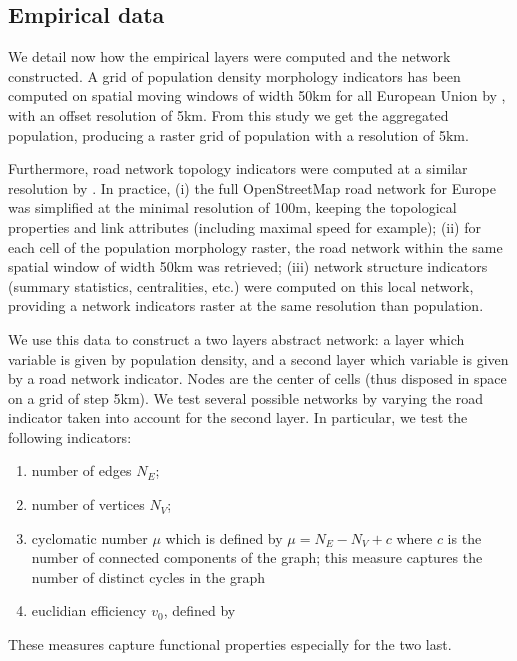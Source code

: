 \documentclass{jimis-en}
\begin{document}
\subsection{Empirical data}


We detail now how the empirical layers were computed and the network constructed. A grid of population density morphology indicators has been computed on spatial moving windows of width 50km for all European Union by \cite{raimbault2018calibration}, with an offset resolution of 5km. From this study we get the aggregated population, producing a raster grid of population with a resolution of 5km.

Furthermore, road network topology indicators were computed at a similar resolution by \cite{raimbault2018urban}. In practice, (i) the full OpenStreetMap road network for Europe was simplified at the minimal resolution of 100m, keeping the topological properties and link attributes (including maximal speed for example); (ii) for each cell of the population morphology raster, the road network within the same spatial window of width 50km was retrieved; (iii) network structure indicators (summary statistics, centralities, etc.) were computed on this local network, providing a network indicators raster at the same resolution than population.

We use this data to construct a two layers abstract network: a layer which variable is given by population density, and a second layer which variable is given by a road network indicator. Nodes are the center of cells (thus disposed in space on a grid of step 5km). We test several possible networks by varying the road indicator taken into account for the second layer. In particular, we test the following indicators:
\begin{enumerate}
	\item number of edges $N_E$;
	\item number of vertices $N_V$;
	\item cyclomatic number $\mu$ which is defined by $\mu = N_E - N_V + c$ where $c$ is the number of connected components of the graph; this measure captures the number of distinct cycles in the graph
	\item euclidian efficiency $v_0$, defined by \cite{banos2012towards}
\end{enumerate}

These measures capture functional properties especially for the two last.

\end{document}
